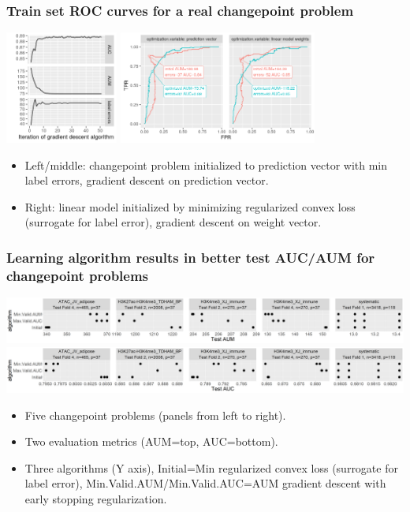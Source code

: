 \documentclass{beamer}
\begin{document}
\begin{frame}
  \frametitle{Train set ROC curves for a real changepoint problem}

\includegraphics[height=3.7cm]{figure-aum-optimized-iterations.png}
\includegraphics[height=3.7cm]{figure-aum-train-both.png}

\begin{itemize}
\item Left/middle: changepoint problem initialized to prediction vector with
  min label errors, gradient descent on prediction vector.
\item Right: linear model initialized by minimizing regularized convex
  loss (surrogate for label error), gradient descent on weight vector.
\end{itemize}

\end{frame}

\begin{frame}
  \frametitle{Learning algorithm results in better test AUC/AUM for changepoint problems}
    
\includegraphics[width=\textwidth]{figure-test-aum-comparison.png}
\includegraphics[width=\textwidth]{figure-test-auc-comparison.png}

\begin{itemize}
\item Five changepoint problems (panels from left to right).
\item Two evaluation metrics (AUM=top, AUC=bottom).
\item Three algorithms (Y axis), Initial=Min regularized convex loss
  (surrogate for label error), Min.Valid.AUM/Min.Valid.AUC=AUM
  gradient descent with early stopping regularization.
\end{itemize}

\end{frame}
\end{document}
